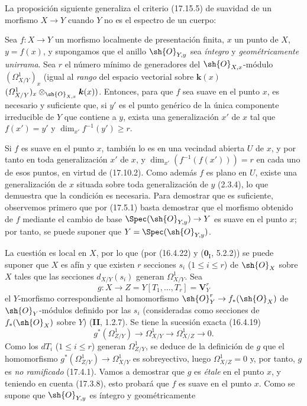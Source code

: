 La proposición siguiente generaliza el criterio (17.15.5) de suavidad de un morfismo $X\to Y$ cuando $Y$ no es el espectro de un cuerpo:

\begin{proposition}[18.10.21]
\label{IV.18.10.21}
Sea $f:X\to Y$ un morfismo localmente de presentación finita, $x$ un punto de $X$, $y=f(x)$, y supongamos que el anillo $\sh{O}_{Y,y}$ sea \emph{íntegro} y \emph{geométricamente unirrama}. Sea $r$ el número mínimo de generadores del $\sh{O}_{X,x}$-módulo $(\varOmega^1_{X/Y})_x$ \textup{(igual al \emph{rango} del espacio vectorial sobre $\boldsymbol{k}(x)$ $(\varOmega^1_{X/Y})_x\otimes_{\sh{O}_{X,x}}\boldsymbol{k}(x))$}. Entonces, para que $f$ sea suave en el punto $x$, es necesario y suficiente que, si $y'$ es el punto genérico de la única componente irreducible de $Y$ que contiene a $y$, exista una generalización $x'$ de $x$ tal que $f(x')=y'$ y $\dim_{x'}f^{-1}(y')\geq r$.
\end{proposition}

Si $f$ es suave en el punto $x$, también lo es en una vecindad abierta $U$ de $x$, y por tanto en toda generalización $x'$ de $x$, y $\dim_{x'}(f^{-1}(f(x')))=r$ en cada uno de esos puntos, en virtud de (17.10.2). Como además $f$ es plano en $U$, existe una generalización de $x$ situada sobre toda generalización de $y$ (2.3.4), lo que demuestra que la condición es necesaria. Para demostrar que es suficiente, observemos primero que por (17.5.1) basta demostrar que el morfismo obtenido de $f$ mediante el cambio de base $\Spec(\sh{O}_{Y,y})\to Y$ es suave en el punto $x$; por tanto, se puede suponer que $Y=\Spec(\sh{O}_{Y,y})$.

La cuestión es local en $X$, por lo que (por (16.4.22) y ($\mathbf{0}_{\mathrm I}$, 5.2.2)) se puede suponer que $X$ es afín y que existen $r$ secciones $s_i$ ($1\leq i\leq r$) de $\sh{O}_X$ sobre $X$ tales que las secciones $d_{X/Y}(s_i)$ generan $\varOmega^1_{X/Y}$. Sea
\[
  g:X\to Z=Y[T_1,\ldots,T_r]=\mathbf V^r_Y
\]
el $Y$-morfismo correspondiente al homomorfismo $\sh{O}_Y^r\to f_*(\sh{O}_X)$ de $\sh{O}_Y$-módulos definido por las $s_i$ (consideradas como secciones de $f_*(\sh{O}_X)$ sobre $Y$) (\textbf{II}, 1.2.7). Se tiene la sucesión exacta (16.4.19)
\[
  g^*(\varOmega^1_{Z/Y})\longrightarrow\varOmega^1_{X/Y}\longrightarrow\varOmega^1_{X/Z}\longrightarrow0.
\]
Como los $dT_i$ ($1\leq i\leq r$) generan $\varOmega^1_{Z/Y}$, se deduce de la definición de $g$ que el homomorfismo $g^*(\varOmega^1_{Z/Y})\to\varOmega^1_{X/Y}$ es sobreyectivo, luego $\varOmega^1_{X/Z}=0$ y, por tanto, $g$ es \emph{no ramificado} (17.4.1). Vamos a demostrar que $g$ es \emph{étale} en el punto $x$, y teniendo en cuenta (17.3.8), esto probará que $f$ es suave en el punto $x$. Como se supone que $\sh{O}_{Y,y}$ es íntegro y geométricamente

